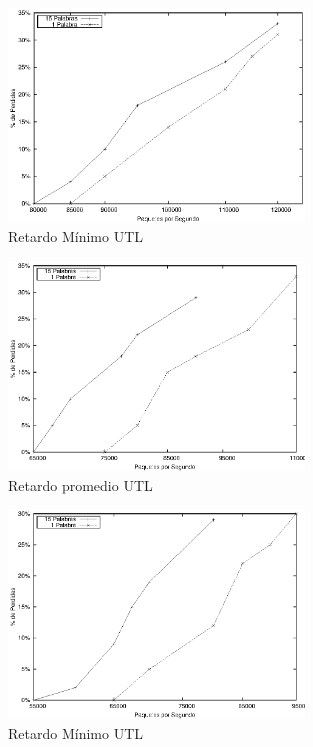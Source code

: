 \begin{figure}[!h]
  \centering
	\includegraphics[width=0.7\textwidth]{5-resultados/graf/utlmin.eps}
  \caption{Retardo Mínimo UTL}
  \label{fig}
\end{figure}
\begin{figure}[!h]
  \centering
	\includegraphics[width=0.7\textwidth]{5-resultados/graf/utlprom.eps}
  \caption{Retardo promedio UTL}
  \label{fig}
\end{figure}
\begin{figure}[!h]
  \centering
	\includegraphics[width=0.7\textwidth]{5-resultados/graf/utlmax.eps}
  \caption{Retardo Mínimo UTL}
  \label{fig}
\end{figure}

